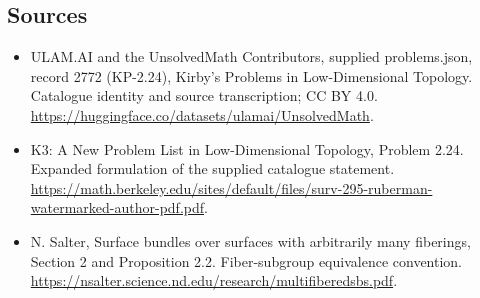 \documentclass[11pt,a4paper]{article}
\begin{document}
\subsection{Sources}
\begin{itemize}
\item[S1] ULAM.AI and the UnsolvedMath Contributors, supplied problems.json, record 2772 (KP-2.24), Kirby's Problems in Low-Dimensional Topology. Catalogue identity and source transcription; CC BY 4.0.
\url{https://huggingface.co/datasets/ulamai/UnsolvedMath}.
\item[S2] K3: A New Problem List in Low-Dimensional Topology, Problem 2.24. Expanded formulation of the supplied catalogue statement.
\url{https://math.berkeley.edu/sites/default/files/surv-295-ruberman-watermarked-author-pdf.pdf}.
\item[S3] N. Salter, Surface bundles over surfaces with arbitrarily many fiberings, Section 2 and Proposition 2.2. Fiber-subgroup equivalence convention.
\url{https://nsalter.science.nd.edu/research/multifiberedsbs.pdf}.
\end{itemize}
\end{document}
